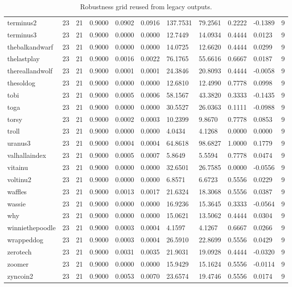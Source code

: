 \begin{table}[htbp]
\begin{tabular}{lllllllllll}
terminus2 & 23 & 21 & 0.9000 & 0.0902 & 0.0916 & 137.7531 & 79.2561 & 0.2222 & -0.1389 & 9 \\
terminus3 & 23 & 21 & 0.9000 & 0.0000 & 0.0000 & 12.7449 & 14.0934 & 0.4444 & 0.0123 & 9 \\
thebalkandwarf & 23 & 21 & 0.9000 & 0.0000 & 0.0000 & 14.0725 & 12.6620 & 0.4444 & 0.0299 & 9 \\
thelastplay & 23 & 21 & 0.9000 & 0.0016 & 0.0022 & 76.1765 & 55.6616 & 0.6667 & 0.0187 & 9 \\
thereallandwolf & 23 & 21 & 0.9000 & 0.0001 & 0.0001 & 24.3846 & 20.8093 & 0.4444 & -0.0058 & 9 \\
thesoldog & 23 & 21 & 0.9000 & 0.0000 & 0.0000 & 12.6810 & 12.4990 & 0.7778 & 0.0998 & 9 \\
tobi & 23 & 21 & 0.9000 & 0.0005 & 0.0006 & 58.1567 & 43.3820 & 0.3333 & -0.1435 & 9 \\
toga & 23 & 21 & 0.9000 & 0.0000 & 0.0000 & 30.5527 & 26.0363 & 0.1111 & -0.0988 & 9 \\
torsy & 23 & 21 & 0.9000 & 0.0002 & 0.0003 & 10.2399 & 9.8670 & 0.7778 & 0.0853 & 9 \\
troll & 23 & 21 & 0.9000 & 0.0000 & 0.0000 & 4.0434 & 4.1268 & 0.0000 & 0.0000 & 9 \\
uranus3 & 23 & 21 & 0.9000 & 0.0004 & 0.0004 & 64.8618 & 98.6827 & 1.0000 & 0.1779 & 9 \\
valhallaindex & 23 & 21 & 0.9000 & 0.0005 & 0.0007 & 5.8649 & 5.5594 & 0.7778 & 0.0474 & 9 \\
vitainu & 23 & 21 & 0.9000 & 0.0000 & 0.0000 & 32.6501 & 26.7585 & 0.0000 & -0.0556 & 9 \\
voltinu2 & 23 & 21 & 0.9000 & 0.0000 & 0.0000 & 6.8571 & 6.6723 & 0.5556 & 0.0229 & 9 \\
waffles & 23 & 21 & 0.9000 & 0.0013 & 0.0017 & 21.6324 & 18.3068 & 0.5556 & 0.0387 & 9 \\
wassie & 23 & 21 & 0.9000 & 0.0000 & 0.0000 & 16.9236 & 15.3645 & 0.3333 & -0.0564 & 9 \\
why & 23 & 21 & 0.9000 & 0.0000 & 0.0000 & 15.0621 & 13.5062 & 0.4444 & 0.0304 & 9 \\
winniethepoodle & 23 & 21 & 0.9000 & 0.0003 & 0.0004 & 4.1597 & 4.1267 & 0.6667 & 0.0266 & 9 \\
wrappeddog & 23 & 21 & 0.9000 & 0.0003 & 0.0004 & 26.5910 & 22.8699 & 0.5556 & 0.0429 & 9 \\
zerotech & 23 & 21 & 0.9000 & 0.0031 & 0.0035 & 21.9031 & 19.0928 & 0.4444 & -0.0320 & 9 \\
zoomer & 23 & 21 & 0.9000 & 0.0000 & 0.0000 & 15.9429 & 15.1624 & 0.5556 & -0.0114 & 9 \\
zyncoin2 & 23 & 21 & 0.9000 & 0.0053 & 0.0070 & 23.6574 & 19.4746 & 0.5556 & 0.0174 & 9 \\
\hline
\end{tabular}
\caption{Robustness grid reused from legacy outputs.}
\label{table_robustness_grid}
\end{table}